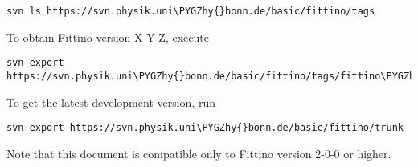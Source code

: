 \documentclass[letterpaper,10pt,english]{sphinxmanual}
\def\PYGZhy{\char`\-}
\begin{document}
\begin{Verbatim}[commandchars=\\\{\}]
svn ls https://svn.physik.uni\PYGZhy{}bonn.de/basic/fittino/tags
\end{Verbatim}

To obtain Fittino version X-Y-Z, execute

\begin{Verbatim}[commandchars=\\\{\}]
svn export https://svn.physik.uni\PYGZhy{}bonn.de/basic/fittino/tags/fittino\PYGZhy{}X\PYGZhy{}Y\PYGZhy{}Z
\end{Verbatim}

To get the latest development version, run

\begin{Verbatim}[commandchars=\\\{\}]
svn export https://svn.physik.uni\PYGZhy{}bonn.de/basic/fittino/trunk
\end{Verbatim}

Note that this document is compatible only to Fittino version 2-0-0 or higher.
\end{document}
